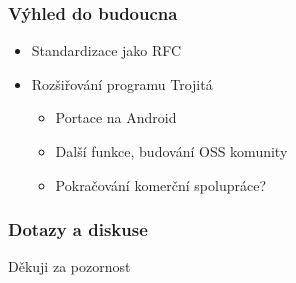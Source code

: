 \documentclass{beamer}
\begin{document}
\begin{frame}[fragile]
  \frametitle{Výhled do budoucna}
  \begin{itemize}
    \item Standardizace jako RFC
    \item Rozšiřování programu Trojitá
      \begin{itemize}
        \item Portace na Android
        \item Další funkce, budování OSS komunity
        \item Pokračování komerční spolupráce?
      \end{itemize}
  \end{itemize}
\end{frame}

\begin{frame}[fragile]
  \frametitle{Dotazy a diskuse}
  \begin{center}
    \Large{Děkuji za pozornost}
  \end{center}
\end{frame}
\end{document}
